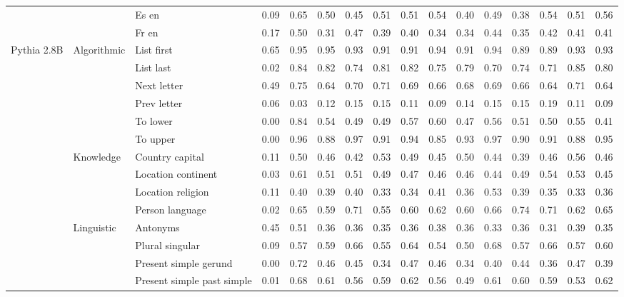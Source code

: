 \begin{center}
\begin{longtable}{lllrrrrrrrrrrrrr}
 &  & Es en & 0.09 & 0.65 & 0.50 & 0.45 & 0.51 & 0.51 & 0.54 & 0.40 & 0.49 & 0.38 & 0.54 & 0.51 & 0.56 \\
 &  & Fr en & 0.17 & 0.50 & 0.31 & 0.47 & 0.39 & 0.40 & 0.34 & 0.34 & 0.44 & 0.35 & 0.42 & 0.41 & 0.41 \\
\cline{1-16} \cline{2-16}
\multirow[t]{18}{*}{Pythia 2.8B} & \multirow[t]{6}{*}{Algorithmic} & List first & 0.65 & 0.95 & 0.95 & 0.93 & 0.91 & 0.91 & 0.94 & 0.91 & 0.94 & 0.89 & 0.89 & 0.93 & 0.93 \\
 &  & List last & 0.02 & 0.84 & 0.82 & 0.74 & 0.81 & 0.82 & 0.75 & 0.79 & 0.70 & 0.74 & 0.71 & 0.85 & 0.80 \\
 &  & Next letter & 0.49 & 0.75 & 0.64 & 0.70 & 0.71 & 0.69 & 0.66 & 0.68 & 0.69 & 0.66 & 0.64 & 0.71 & 0.64 \\
 &  & Prev letter & 0.06 & 0.03 & 0.12 & 0.15 & 0.15 & 0.11 & 0.09 & 0.14 & 0.15 & 0.15 & 0.19 & 0.11 & 0.09 \\
 &  & To lower & 0.00 & 0.84 & 0.54 & 0.49 & 0.49 & 0.57 & 0.60 & 0.47 & 0.56 & 0.51 & 0.50 & 0.55 & 0.41 \\
 &  & To upper & 0.00 & 0.96 & 0.88 & 0.97 & 0.91 & 0.94 & 0.85 & 0.93 & 0.97 & 0.90 & 0.91 & 0.88 & 0.95 \\
\cline{2-16}
 & \multirow[t]{4}{*}{Knowledge} & Country capital & 0.11 & 0.50 & 0.46 & 0.42 & 0.53 & 0.49 & 0.45 & 0.50 & 0.44 & 0.39 & 0.46 & 0.56 & 0.46 \\
 &  & Location continent & 0.03 & 0.61 & 0.51 & 0.51 & 0.49 & 0.47 & 0.46 & 0.46 & 0.44 & 0.49 & 0.54 & 0.53 & 0.45 \\
 &  & Location religion & 0.11 & 0.40 & 0.39 & 0.40 & 0.33 & 0.34 & 0.41 & 0.36 & 0.53 & 0.39 & 0.35 & 0.33 & 0.36 \\
 &  & Person language & 0.02 & 0.65 & 0.59 & 0.71 & 0.55 & 0.60 & 0.62 & 0.60 & 0.66 & 0.74 & 0.71 & 0.62 & 0.65 \\
\cline{2-16}
 & \multirow[t]{4}{*}{Linguistic} & Antonyms & 0.45 & 0.51 & 0.36 & 0.36 & 0.35 & 0.36 & 0.38 & 0.36 & 0.33 & 0.36 & 0.31 & 0.39 & 0.35 \\
 &  & Plural singular & 0.09 & 0.57 & 0.59 & 0.66 & 0.55 & 0.64 & 0.54 & 0.50 & 0.68 & 0.57 & 0.66 & 0.57 & 0.60 \\
 &  & Present simple gerund & 0.00 & 0.72 & 0.46 & 0.45 & 0.34 & 0.47 & 0.46 & 0.34 & 0.40 & 0.44 & 0.36 & 0.47 & 0.39 \\
 &  & Present simple past simple & 0.01 & 0.68 & 0.61 & 0.56 & 0.59 & 0.62 & 0.56 & 0.49 & 0.61 & 0.60 & 0.59 & 0.53 & 0.62 \\

\end{longtable}
\end{center}
